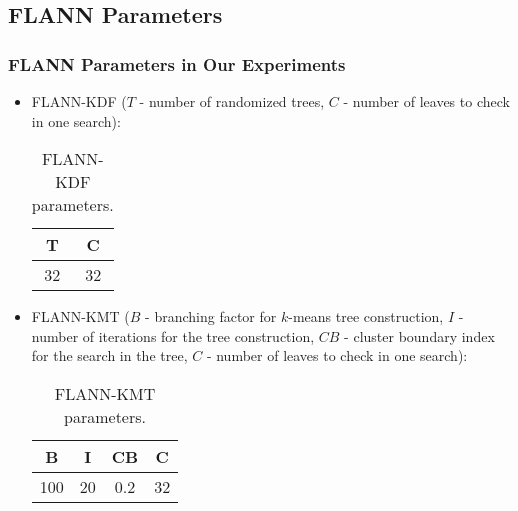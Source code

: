 \subsection*{FLANN Parameters}

\begin{frame}
	\frametitle{FLANN Parameters in Our Experiments}
	
\begin{itemize}
	\item FLANN-KDF ($T$ - number of randomized trees, $C$ - number of leaves to check in one search):
	\begin{table}
		\small
		\begin{tabular}{|| c | c ||}
			\hline
			T & C \\
			\hline
			\hline			
			32 & 32 \\
			\hline  
		\end{tabular}
	\caption{FLANN-KDF parameters.}
	\label{tab:flann-kdf-par}
	\end{table}
	\item FLANN-KMT ($B$ - branching factor for $k$-means tree construction, $I$ - number of iterations for the tree construction, $CB$ - cluster boundary index for the search in the tree, $C$ - number of leaves to check in one search):
	\begin{table}
		\small
		\begin{tabular}{|| c | c | c | c ||}
			\hline
			B & I & CB & C \\
			\hline
			\hline			
			100 & 20 & 0.2 & 32  \\
			\hline  
		\end{tabular}
	\caption{FLANN-KMT parameters.}
	\label{tab:flann-kmt-par}
	\end{table}
\end{itemize}
\end{frame}